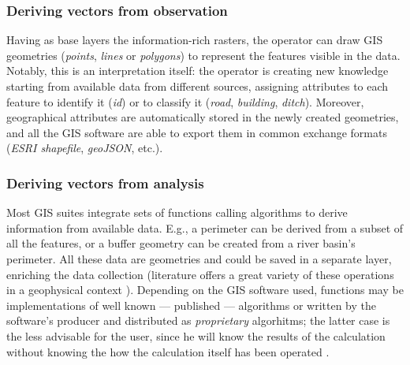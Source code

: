             \subsubsection{Deriving vectors from observation}
                Having as base layers the information-rich rasters, the operator can draw GIS geometries (\emph{points}, \emph{lines} or \emph{polygons}) to represent the features visible in the data. Notably, this is an interpretation itself: the operator is creating new knowledge starting from available data from different sources, assigning attributes to each feature to identify it (\emph{id}) or to classify it (\emph{road}, \emph{building}, \emph{ditch}). Moreover, geographical attributes are automatically stored in the newly created geometries, and all the GIS software are able to export them in common exchange formats (\emph{ESRI shapefile}, \emph{geoJSON}, etc.).

            \subsubsection{Deriving vectors from analysis}
                Most GIS suites integrate sets of functions calling algorithms to derive information from available data. E.g., a perimeter can be derived from a subset of all the features, or a buffer geometry can be created from a river basin's perimeter. All these data are geometries and could be saved in a separate layer, enriching the data collection (literature offers a great variety of these operations in a geophysical context \cite[p.~325]{remote-ciminale}). Depending on the GIS software used, functions may be implementations of well known --- published --- algorithms or written by the software's producer and distributed as \emph{proprietary} algorhitms; the latter case is the less advisable for the user, since he will know the results of the calculation without knowing the how the calculation itself has been operated \cite[p.~69]{fronza-informatica}.

